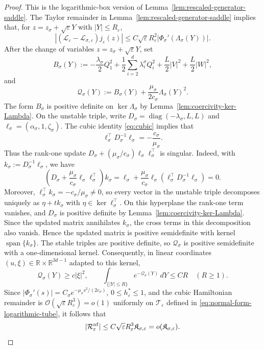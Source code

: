 \documentclass[11pt]{article}
\numberwithin{equation}{section}
\theoremstyle{plain}
\theoremstyle{definition}
\theoremstyle{remark}
\newcommand{\R}{\mathbb R}
\newcommand{\eps}{\varepsilon}
\newcommand{\calL}{\mathcal L}
\begin{document}
\begin{proof}
This is the logarithmic-box version of
Lemma~\ref{lem:rescaled-generator-saddle}.
The Taylor remainder in Lemma~\ref{lem:rescaled-generator-saddle} implies that,
for $z=z_\sigma+\sqrt\eps Y$ with $|Y|\le R_\eps$,
\[
\left|\left(\calL_\eps-\calL_{\sigma,\eps}\right)j_\eps(z)\right|
\le C\sqrt\eps R_\eps^2
\left|\Phi_\sigma'(\Lambda_\sigma(Y))\right|.
\]
After the change of variables $z=z_\sigma+\sqrt\eps Y$, set
\[
B_\sigma(Y):=
-\frac{\lambda_\sigma}{2}Q_1^2
+\frac12\sum_{i=2}^d\lambda_i^\sigma Q_i^2
+\frac L2|V|^2+\frac L2|W|^2,
\]
and
\[
\mathscr Q_\sigma(Y)
:=B_\sigma(Y)+\frac{\mu_\sigma}{2c_\sigma}
\Lambda_\sigma(Y)^2.
\]
The form $B_\sigma$ is positive definite on $\ker\Lambda_\sigma$ by
Lemma~\ref{lem:coercivity-ker-Lambda}.  On the unstable triple, write
$D_\sigma=\operatorname{diag}(-\lambda_\sigma,L,L)$ and
$\ell_\sigma=(\alpha_\sigma,1,\zeta_\sigma)$.  The cubic identity
\eqref{eq:cubic} implies that
\[
\ell_\sigma^\top D_\sigma^{-1}\ell_\sigma
=-\frac{c_\sigma}{\mu_\sigma}.
\]
Thus the rank-one update
$D_\sigma+(\mu_\sigma/c_\sigma)\ell_\sigma\ell_\sigma^\top$ is singular.
Indeed, with $k_\sigma:=D_\sigma^{-1}\ell_\sigma$, we have
\[
\left(D_\sigma+\frac{\mu_\sigma}{c_\sigma}
\ell_\sigma\ell_\sigma^\top\right)k_\sigma
=\ell_\sigma+\frac{\mu_\sigma}{c_\sigma}\ell_\sigma
\left(\ell_\sigma^\top D_\sigma^{-1}\ell_\sigma\right)=0.
\]
Moreover,
$\ell_\sigma^\top k_\sigma=-c_\sigma/\mu_\sigma\ne0$, so every vector in
the unstable triple decomposes uniquely as $\eta+t k_\sigma$ with
$\eta\in\ker\ell_\sigma^\top$.  On this hyperplane the rank-one term
vanishes, and $D_\sigma$ is positive definite by
Lemma~\ref{lem:coercivity-ker-Lambda}.  Since the updated matrix annihilates
$k_\sigma$, the cross terms in this decomposition also vanish.  Hence the
updated matrix is positive semidefinite with kernel
$\operatorname{span}\{k_\sigma\}$.  The stable triples are positive definite,
so $\mathscr Q_\sigma$ is positive semidefinite with a one-dimensional
kernel.
Consequently, in linear coordinates $(u,\xi)\in\R\times\R^{3d-1}$ adapted to
this kernel,
\[
\mathscr Q_\sigma(Y)\ge c|\xi|^2,
\qquad
\int_{\{|Y|\le R\}}e^{-\mathscr Q_\sigma(Y)}\,dY\le CR
\quad(R\ge1).
\]
Since
$|\Phi_\sigma'(s)|=C_\sigma
e^{-\mu_\sigma s^2/(2c_\sigma)}$, $0\le h_\eps^*\le1$, and the cubic
Hamiltonian remainder is $\mathcal O(\sqrt\eps R_\eps^3)=o(1)$ uniformly on
$\mathcal T_\eps$ defined in \eqref{eq:normal-form-logarithmic-tube},
it follows that
\[
|\mathcal R_\eps^{\rm nf}|
\le C\sqrt\eps R_\eps^3\mathfrak K_{\sigma,\eps}
=o(\mathfrak K_{\sigma,\eps}).
\]
\end{proof}
\end{document}
